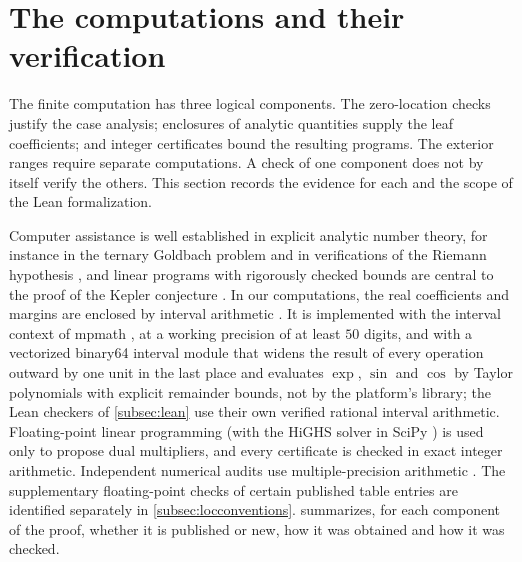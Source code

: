 \section{The computations and their verification}\label{sec:verification}

The finite computation has three logical components. The zero-location checks justify
the case analysis; enclosures of analytic quantities supply the leaf coefficients;
and integer certificates bound the resulting programs. The exterior ranges require
separate computations. A check of one component does not by itself verify the others.
This section records the evidence for each and the scope of the Lean formalization.

Computer assistance is well established in explicit analytic number theory, for instance in the
ternary Goldbach problem \cite{Helfgott2015ternary} and in verifications of the Riemann hypothesis
\cite{Platt2016numerical,PlattTrudgian2021riemann}, and linear programs with rigorously checked
bounds are central to the proof of the Kepler conjecture \cite{ObuaNipkow2009flyspeck,
SolovyevHales2011efficient,Hales2017formal}. In our computations, the real coefficients and
margins are enclosed by interval arithmetic \cite{Moore1966interval,MooreKearfottCloud2009introduction,
Rump2010verification,Tucker2011validated}. It is implemented with the interval context of mpmath
\cite{mpmath2023library}, at a working precision of at least $50$ digits, and with a vectorized
binary64 interval module that widens the result of every operation outward by one unit in the
last place and evaluates $\exp$, $\sin$ and $\cos$ by Taylor polynomials with explicit remainder
bounds, not by the platform's library; the Lean checkers of \cref{subsec:lean} use their own
verified rational interval arithmetic. Floating-point linear programming (with the HiGHS solver
\cite{HuangfuHall2018parallelizing} in SciPy \cite{Virtanen2020scipy}) is used only to propose dual
multipliers, and every certificate is checked in exact integer arithmetic. Independent
numerical audits use multiple-precision arithmetic \cite{mpmath2023library}.
The supplementary floating-point checks of certain published table entries are
identified separately in \cref{subsec:locconventions}.  summarizes, for each
component of the proof, whether it is published or new, how it was obtained and how it was
checked.

